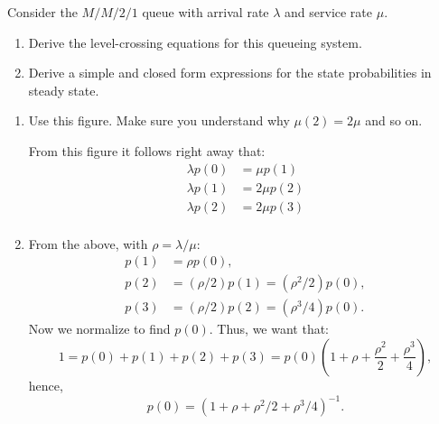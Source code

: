 \begin{question}
Consider the $M/M/2/1$ queue with arrival rate $\lambda$ and
service rate $\mu$. 
\begin{enumerate}
\item Derive the level-crossing equations for this queueing system. 
\item 
Derive a simple and closed form expressions for the state 
   probabilities in steady state. 
 \end{enumerate}
 

  \begin{solution}

    \begin{enumerate}
    \item Use this figure. Make sure you understand why $\mu(2)=2\mu$ and so on.
    \begin{center}

      
    \end{center}

From this figure it follows right away that:
    \begin{align*}
   \lambda p(0) &= \mu p(1) \\
   \lambda p(1)  &= 2\mu p(2) \\
   \lambda p(2)  &= 2\mu p(3)\\
    \end{align*}

  \item From the above, with $\rho=\lambda/\mu$: 
    \begin{align*}
      p(1) &= \rho p(0), \\
      p(2) &= (\rho/2) p(1) = (\rho^2/2) p(0), \\
      p(3) &= (\rho/2) p(2) = (\rho^3/4) p(0).
    \end{align*}
Now we normalize to find $p(0)$. Thus, we want that:
\begin{equation*}
  1 = p(0)+p(1)+p(2)+p(3) = p(0)\left(1 + \rho + \frac{\rho^2}2 + \frac{\rho^3}4\right),
\end{equation*}
hence,
\begin{equation*}
p(0) = (1+\rho + \rho^2/2 + \rho^3/4)^{-1}.
\end{equation*}
\end{enumerate}
   \end{solution}
\end{question}


